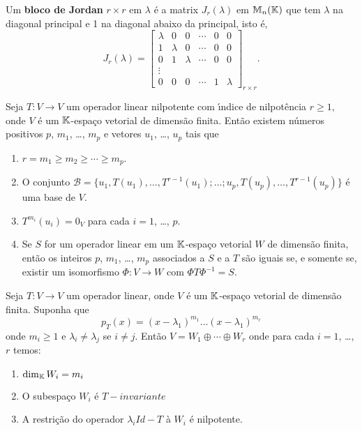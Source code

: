 \begin{definicao}
	Um \textbf{bloco de Jordan} $r \times r$ em $\lambda$ \'e a matrix $J_r(\lambda)$ em $\mathbb{M}_n(\mathbb{K})$ que tem $\lambda$ na diagonal principal e 1 na diagonal abaixo da principal, isto \'e,
	\[
	J_r(\lambda) = \begin{bmatrix}
		\lambda & 0 & 0 & \cdots & 0 & 0\\
		1 & \lambda & 0 & \cdots & 0 & 0\\
		0 & 1 & \lambda & \cdots & 0 & 0\\
		\vdots\\
		0 & 0 & 0 & \cdots & 1 & \lambda
	\end{bmatrix}_{r \times r}.
\]
\end{definicao}

\begin{teorema}\label{operadornilpotente}
	Seja $T : V \to V$ um operador linear nilpotente com {\'\i}ndice de nilpot\^encia $r \ge 1$, onde $V$ \'e um $\mathbb{K}$-espa\c{c}o vetorial de dimens\~ao finita. Ent\~ao existem n\'umeros positivos $p$, $m_1$, \dots, $m_p$ e vetores $u_1$, \dots, $u_p$ tais que
	\begin{enumerate}[label=({\alph*})]
		\item $r = m_1 \ge m_2 \ge \cdots \ge m_p$.
		\item O conjunto $\mathcal{B} = \{u_1, T(u_1), \dots, T^{r - 1}(u_1); \dots; u_p, T(u_p), \dots, T^{r - 1}(u_p)\}$ \'e uma base de $V$.
		\item $T^{m_i}(u_i) = 0_V$ para cada $i = 1$, \dots, $p$.
		\item Se $S$ for um operador linear em um $\mathbb{K}$-espa\c{c}o vetorial $W$ de dimens\~ao finita, ent\~ao os inteiros $p$, $m_1$, \dots, $m_p$ associados a $S$ e a $T$ s\~ao iguais se, e somente se, existir um isomorfismo $\Phi : V \to W$ com $\Phi T \Phi^{-1} = S$.
	\end{enumerate}
\end{teorema}

\begin{teorema}\label{formadejordan}
	Seja $T : V \to V$ um operador linear, onde $V$ \'e um $\mathbb{K}$-espa\c{c}o vetorial de dimens\~ao finita. Suponha que
	\[
		p_T(x) = (x - \lambda_1)^{m_1}\dots(x - \lambda_1)^{m_r}
	\]
	onde $m_i \ge 1$ e $\lambda_i \ne \lambda_j$ se $i \ne j$. Ent\~ao $V = W_1 \oplus \cdots \oplus W_r$ onde para cada $i = 1$, \dots, $r$ temos:
	\begin{enumerate}[label=({\alph*})]
		\item $\dim_{\mathbb{K}} W_i = m_i$
		\item O subespa\c{c}o $W_i$ \'e $T-invariante$
		\item A restri\c{c}\~ao do operador $\lambda_i Id - T$ \`a $W_i$ \'e nilpotente.
	\end{enumerate}
\end{teorema}

